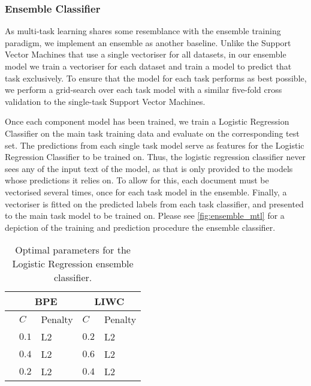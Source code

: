 \subsubsection{Ensemble Classifier}

As multi-task learning shares some resemblance with the ensemble training paradigm, we implement an ensemble as another baseline. Unlike the Support Vector Machines that use a single vectoriser for all datasets, in our ensemble model we train a vectoriser for each dataset and train a model to predict that task exclusively. To ensure that the model for each task performs as best possible, we perform a grid-search over each task model with a similar five-fold cross validation to the single-task Support Vector Machines.
\begin{figure}
  \centering
  \label{fig:ensemble_mtl}
\end{figure}

Once each component model has been trained, we train a Logistic Regression Classifier on the main task training data and evaluate on the corresponding test set. The predictions from each single task model serve as features for the Logistic Regression Classifier to be trained on. Thus, the logistic regression classifier never sees any of the input text of the model, as that is only provided to the models whose predictions it relies on. To allow for this, each document must be vectorised several times, once for each task model in the ensemble. Finally, a vectoriser is fitted on the predicted labels from each task classifier, and presented to the main task model to be trained on. Please see \autoref{fig:ensemble_mtl} for a depiction of the training and prediction procedure the ensemble classifier.

\begin{table}[]
\centering
\begin{tabular}{l|ll|ll}
                     & \multicolumn{2}{c}{BPE} & \multicolumn{2}{c}{LIWC} \\ \hline
                     & $C$     & Penalty       & $C$      & Penalty       \\ \hline
\cite{Waseem:2016}   & $0.1$   & L2            & $0.2$    & L2             \\
\cite{Davidson:2017} & $0.4$   & L2            & $0.6$    & L2             \\
\cite{Wulczyn:2017}  & $0.2$   & L2            & $0.4$    & L2
\end{tabular}
\caption{Optimal parameters for the Logistic Regression ensemble classifier.}
\label{tab:mtl_ensemble_parameters}
\end{table}

